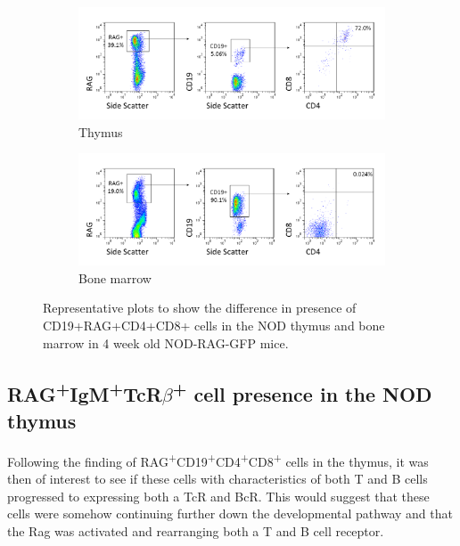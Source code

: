 \begin{figure}	
	\begin{subfigure}{\textwidth}
	\includegraphics[width=\textwidth]{Figures/Thymus1RAGCD19DP.png}
	\caption{Thymus}
	\end{subfigure}
	\begin{subfigure}{\textwidth}
	\includegraphics[width=\textwidth]{Figures/BM1RAGCD19DP.png}
	\caption{Bone marrow}
	\end{subfigure}
\caption{Representative plots to show the difference in presence of CD19+RAG+CD4+CD8+ cells in the NOD thymus and bone marrow in 4 week old NOD-RAG-GFP mice.}
\label{fig:RAGCD19CD4CD8pos}
\end{figure}




\subsection{RAG\textsuperscript{+}IgM\textsuperscript{+}TcR$\beta$\textsuperscript{+} cell presence in the NOD thymus}

Following the finding of RAG\textsuperscript{+}CD19\textsuperscript{+}CD4\textsuperscript{+}CD8\textsuperscript{+} cells in the thymus, it was then of interest to see if these cells with characteristics of both T and B cells progressed to expressing both a TcR and BcR.
This would suggest that these cells were somehow continuing further down the developmental pathway and that the Rag was activated and rearranging both a T and B cell receptor.

